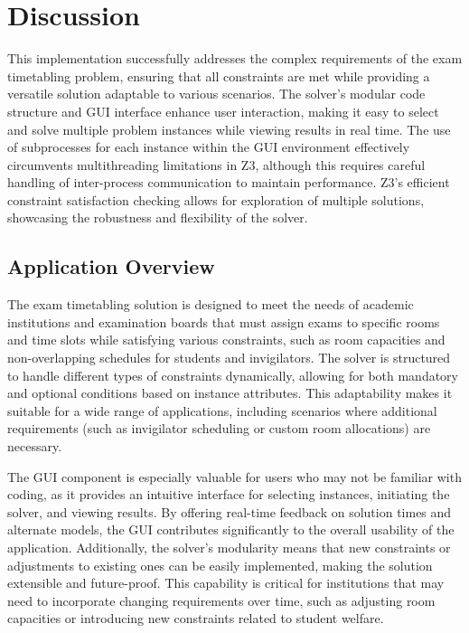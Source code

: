 \documentclass[a4paper]{article}
\begin{document}
    \section{Discussion}
    This implementation successfully addresses the complex requirements of the exam timetabling problem, ensuring that all constraints are met while providing a versatile solution adaptable to various scenarios. The solver’s modular code structure and GUI interface enhance user interaction, making it easy to select and solve multiple problem instances while viewing results in real time. The use of subprocesses for each instance within the GUI environment effectively circumvents multithreading limitations in Z3, although this requires careful handling of inter-process communication to maintain performance. Z3’s efficient constraint satisfaction checking allows for exploration of multiple solutions, showcasing the robustness and flexibility of the solver.
    
    \subsection{Application Overview}
    The exam timetabling solution is designed to meet the needs of academic institutions and examination boards that must assign exams to specific rooms and time slots while satisfying various constraints, such as room capacities and non-overlapping schedules for students and invigilators. The solver is structured to handle different types of constraints dynamically, allowing for both mandatory and optional conditions based on instance attributes. This adaptability makes it suitable for a wide range of applications, including scenarios where additional requirements (such as invigilator scheduling or custom room allocations) are necessary. 
    
    The GUI component is especially valuable for users who may not be familiar with coding, as it provides an intuitive interface for selecting instances, initiating the solver, and viewing results. By offering real-time feedback on solution times and alternate models, the GUI contributes significantly to the overall usability of the application. Additionally, the solver's modularity means that new constraints or adjustments to existing ones can be easily implemented, making the solution extensible and future-proof. This capability is critical for institutions that may need to incorporate changing requirements over time, such as adjusting room capacities or introducing new constraints related to student welfare.
    
\end{document}
